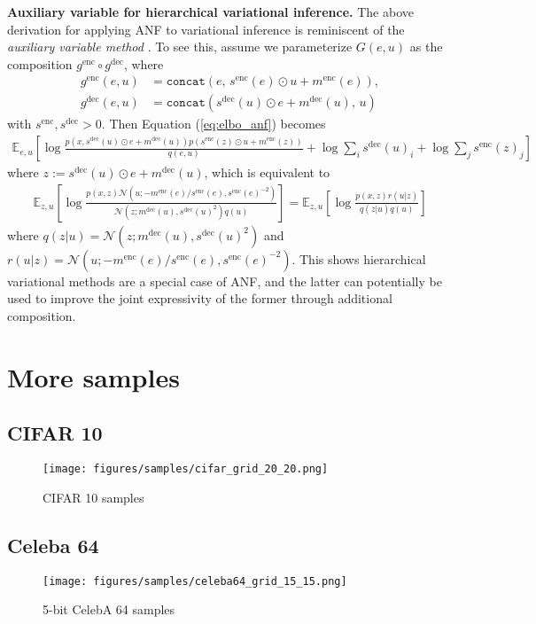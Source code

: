 \documentclass{article}
\def\gN{{\mathcal{N}}}
\newcommand{\E}{\mathbb{E}}
\begin{document}
{\bf Auxiliary variable for hierarchical variational inference.} The above derivation for applying ANF to variational inference is reminiscent of the \textit{auxiliary variable method} \citep{agakov2004auxiliary, ranganath2016hierarchical}.
To see this, assume we parameterize $G(e,u)$ as the composition $g^\text{enc}\circ g^\text{dec}$, where 
\begin{align*}
g^{\text{enc}}(e, u) &= \texttt{concat}(e,\, s^\text{enc}(e)\odot u + m^\text{enc}(e)), \\
g^{\text{dec}}(e, u) &= \texttt{concat}(s^\text{dec}(u)\odot e + m^\text{dec}(u),\, u)
\end{align*}
with $s^\text{enc}, s^\text{dec}>0$.
Then Equation (\ref{eq:elbo_anf})
becomes
\begin{align*}
\E_{e,u}\left[\log\frac{p(x, s^\text{dec}(u)\odot e + m^\text{dec}(u))p( s^\text{enc}(z)\odot u + m^\text{enc}(z) )}{q(e,u)}+\log\sum_i s^\text{dec}(u)_i + \log\sum_j s^\text{enc}(z)_j\right]
\end{align*}
where $z:= s^\text{dec}(u)\odot e + m^\text{dec}(u)$, which is equivalent to
\begin{align*}
\E_{z,u}\left[\log\frac{p(x,z)\gN(u ;  - m^\text{enc}(e)/s^\text{enc}(e), s^\text{enc}(e)^{-2})}{\gN(z; m^\text{dec}(u), s^\text{dec}(u)^2)q(u)} \right] = \E_{z,u}\left[\log\frac{p(x,z) r(u|z)}{q(z|u)q(u)} \right] 
\end{align*}
where $q(z|u)=\gN(z; m^\text{dec}(u), s^\text{dec}(u)^2)$ and $r(u|z)=\gN(u ;  - m^\text{enc}(e)/s^\text{enc}(e), s^\text{enc}(e)^{-2})$.
This shows hierarchical variational methods are a special case of ANF, and the latter can potentially be used to improve the joint expressivity of the former through additional composition. 


\newpage
\section{More samples}
\label{app:samples}
\subsection{CIFAR 10}
\begin{figure*}[h!]
    \centering
    \texttt{[image: figures/samples/cifar\_grid\_20\_20.png]}
    \caption{CIFAR 10 samples}
    \label{fig:cifar_grid}
\end{figure*}

\newpage
\subsection{Celeba 64}
\begin{figure*}[h!]
    \centering
    \texttt{[image: figures/samples/celeba64\_grid\_15\_15.png]}
    \caption{5-bit CelebA 64 samples}
    \label{fig:cifar_grid}
\end{figure*}
\end{document}

